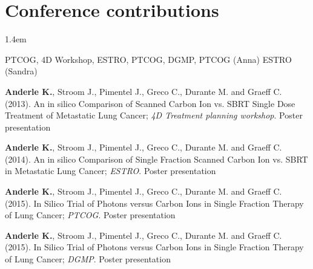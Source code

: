 \section*{Conference contributions}
\begin{setlength}{\leftmargini}{1.4em}
  \begin{description}
  	PTCOG, 4D Workshop, ESTRO, PTCOG, DGMP, PTCOG (Anna) ESTRO (Sandra)
    \item[] \textbf{Anderle K.}, Stroom J., Pimentel J., Greco C., Durante M. and Graeff C. (2013). An in silico Comparison of Scanned Carbon Ion vs. SBRT Single Dose Treatment of Metastatic Lung Cancer; \textit{4D Treatment planning workshop}. Poster presentation
    \item[] \textbf{Anderle K.}, Stroom J., Pimentel J., Greco C., Durante M. and Graeff C. (2014). An in silico Comparison of Single Fraction Scanned Carbon Ion vs. SBRT in Metastatic Lung Cancer; \textit{ESTRO}. Poster presentation
    \item[] \textbf{Anderle K.}, Stroom J., Pimentel J., Greco C., Durante M. and Graeff C. (2015). In Silico Trial of Photons versus Carbon Ions in Single Fraction Therapy of Lung Cancer; \textit{PTCOG}. Poster presentation
    \item[] \textbf{Anderle K.}, Stroom J., Pimentel J., Greco C., Durante M. and Graeff C. (2015). In Silico Trial of Photons versus Carbon Ions in Single Fraction Therapy of Lung Cancer; \textit{DGMP}. Poster presentation
    
    
    
      \end{description}
\end{setlength}




% 